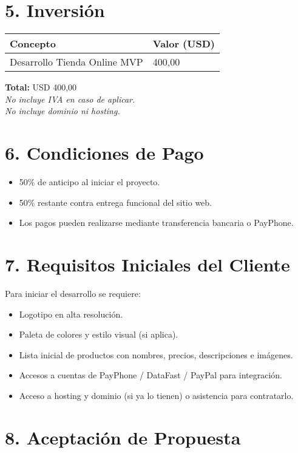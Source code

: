 \documentclass[12pt,a4paper]{article}
\begin{document}
\section*{5. Inversión}

\begin{center}
\begin{tabular}{| m{8cm} | m{3cm} |}
\hline
\textbf{Concepto} & \textbf{Valor (USD)}\\
\hline
Desarrollo Tienda Online MVP & 400,00 \\
\hline
\end{tabular}
\end{center}

\noindent
\textbf{Total:} USD 400,00\\
\smallskip
\textit{No incluye IVA en caso de aplicar.}\\
\textit{No incluye dominio ni hosting.}

\section*{6. Condiciones de Pago}
\begin{itemize}
    \item 50\% de anticipo al iniciar el proyecto.
    \item 50\% restante contra entrega funcional del sitio web.
    \item Los pagos pueden realizarse mediante transferencia bancaria o PayPhone.
\end{itemize}

\section*{7. Requisitos Iniciales del Cliente}
Para iniciar el desarrollo se requiere:
\begin{itemize}
    \item Logotipo en alta resolución.
    \item Paleta de colores y estilo visual (si aplica).
    \item Lista inicial de productos con nombres, precios, descripciones e imágenes.
    \item Accesos a cuentas de PayPhone / DataFast / PayPal para integración.
    \item Acceso a hosting y dominio (si ya lo tienen) o asistencia para contratarlo.
\end{itemize}

\section*{8. Aceptación de Propuesta}
\end{document}
